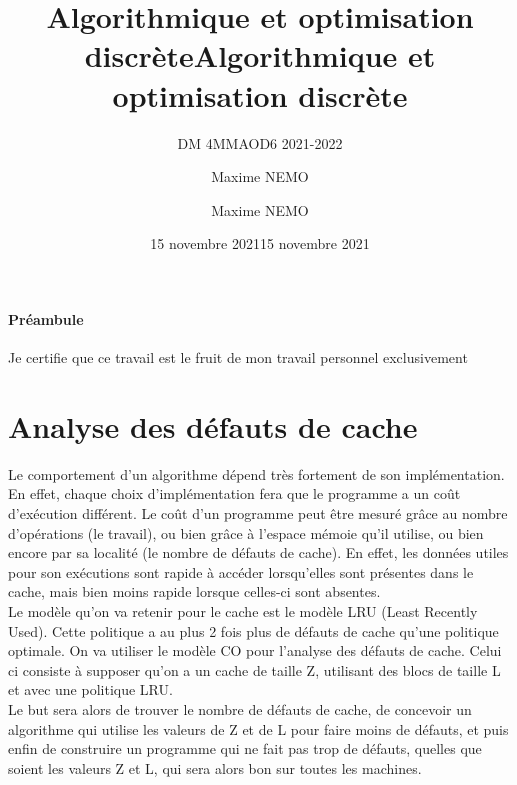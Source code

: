 \documentclass[
  paper=a4,
  ,captions=tableheading
]{scrartcl}
\title{Algorithmique et optimisation discrète}
\subtitle{DM 4MMAOD6 2021-2022}
\author{Maxime NEMO}
\date{15 novembre 2021}
\title{Algorithmique et optimisation discrète}
\author{Maxime NEMO}
\date{15 novembre 2021}
\begin{document}
\begin{titlepage}
\newcommand{\colorRule}[3][black]{\textcolor[HTML]{#1}{\rule{#2}{#3}}}
\end{titlepage}
\restoregeometry




{
\setcounter{tocdepth}{2}
\tableofcontents
\newpage
}
\hypertarget{pruxe9ambule}{%
\paragraph{Préambule}\label{pruxe9ambule}}

Je certifie que ce travail est le fruit de mon travail personnel
exclusivement

\hypertarget{analyse-des-duxe9fauts-de-cache}{%
\section{Analyse des défauts de
cache}\label{analyse-des-duxe9fauts-de-cache}}

Le comportement d'un algorithme dépend très fortement de son
implémentation. En effet, chaque choix d'implémentation fera que le
programme a un coût d'exécution différent. Le coût d'un programme peut
être mesuré grâce au nombre d'opérations (le travail), ou bien grâce à
l'espace mémoie qu'il utilise, ou bien encore par sa localité (le nombre
de défauts de cache). En effet, les données utiles pour son exécutions
sont rapide à accéder lorsqu'elles sont présentes dans le cache, mais
bien moins rapide lorsque celles-ci sont absentes.\\
Le modèle qu'on va retenir pour le cache est le modèle LRU (Least
Recently Used). Cette politique a au plus 2 fois plus de défauts de
cache qu'une politique optimale. On va utiliser le modèle CO pour
l'analyse des défauts de cache. Celui ci consiste à supposer qu'on a un
cache de taille Z, utilisant des blocs de taille L et avec une politique
LRU.\\
Le but sera alors de trouver le nombre de défauts de cache, de concevoir
un algorithme qui utilise les valeurs de Z et de L pour faire moins de
défauts, et puis enfin de construire un programme qui ne fait pas trop
de défauts, quelles que soient les valeurs Z et L, qui sera alors bon
sur toutes les machines.\\
\hspace*{0.333em}
\end{document}
